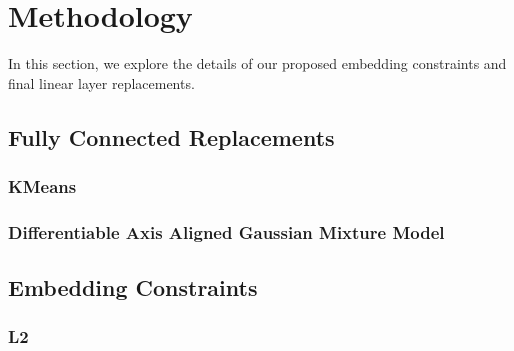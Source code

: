 \documentclass[10pt,twocolumn,letterpaper]{article}
\begin{document}



\section{Methodology}

In this section, we explore the details of our proposed embedding constraints and final linear layer replacements.

%

\subsection{Fully Connected Replacements}

\subsubsection{KMeans}

\subsubsection{Differentiable Axis Aligned Gaussian Mixture Model}


\subsection{Embedding Constraints}

\subsubsection{L2}
\end{document}
